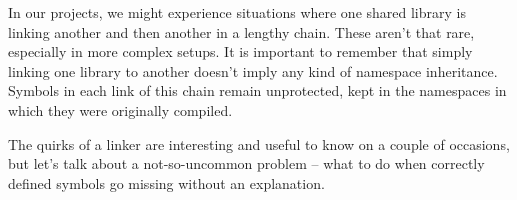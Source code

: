 In our projects, we might experience situations where one shared library is linking another and then another in a lengthy chain. These aren't that rare, especially in more complex setups. It is important to remember that simply linking one library to another doesn't imply any kind of namespace inheritance. Symbols in each link of this chain remain unprotected, kept in the namespaces in which they were originally compiled.

The quirks of a linker are interesting and useful to know on a couple of occasions, but let's talk about a not-so-uncommon problem – what to do when correctly defined symbols go missing without an explanation.













